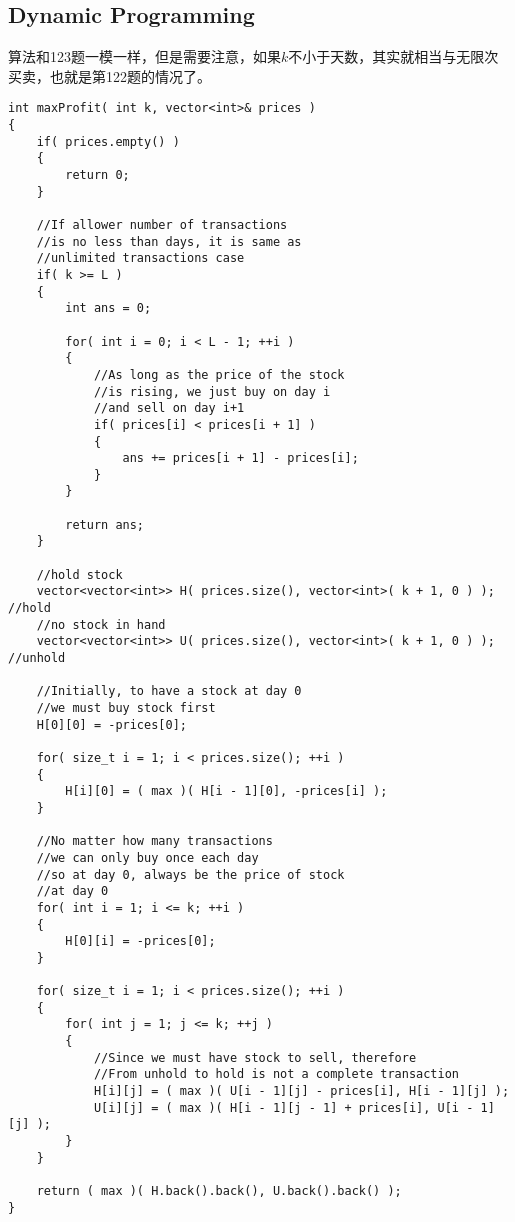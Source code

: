 \subsection{Dynamic Programming}
算法和123题一模一样，但是需要注意，如果$k$不小于天数，其实就相当与无限次买卖，也就是第122题的情况了。
\setcounter{lstlisting}{0}
\begin{lstlisting}[style=customc, caption={Dynamic Programming}]
int maxProfit( int k, vector<int>& prices )
{
    if( prices.empty() )
    {
        return 0;
    }

	//If allower number of transactions
	//is no less than days, it is same as
	//unlimited transactions case
    if( k >= L )
    {
        int ans = 0;

        for( int i = 0; i < L - 1; ++i )
        {
			//As long as the price of the stock
			//is rising, we just buy on day i
			//and sell on day i+1
            if( prices[i] < prices[i + 1] )
            {
                ans += prices[i + 1] - prices[i];
            }
        }

        return ans;
    }

    //hold stock
    vector<vector<int>> H( prices.size(), vector<int>( k + 1, 0 ) ); //hold
    //no stock in hand
    vector<vector<int>> U( prices.size(), vector<int>( k + 1, 0 ) ); //unhold

    //Initially, to have a stock at day 0
    //we must buy stock first
    H[0][0] = -prices[0];

    for( size_t i = 1; i < prices.size(); ++i )
    {
        H[i][0] = ( max )( H[i - 1][0], -prices[i] );
    }

    //No matter how many transactions
    //we can only buy once each day
    //so at day 0, always be the price of stock
    //at day 0
    for( int i = 1; i <= k; ++i )
    {
        H[0][i] = -prices[0];
    }

    for( size_t i = 1; i < prices.size(); ++i )
    {
        for( int j = 1; j <= k; ++j )
        {
            //Since we must have stock to sell, therefore
            //From unhold to hold is not a complete transaction
            H[i][j] = ( max )( U[i - 1][j] - prices[i], H[i - 1][j] );
            U[i][j] = ( max )( H[i - 1][j - 1] + prices[i], U[i - 1][j] );
        }
    }

    return ( max )( H.back().back(), U.back().back() );
}
\end{lstlisting}